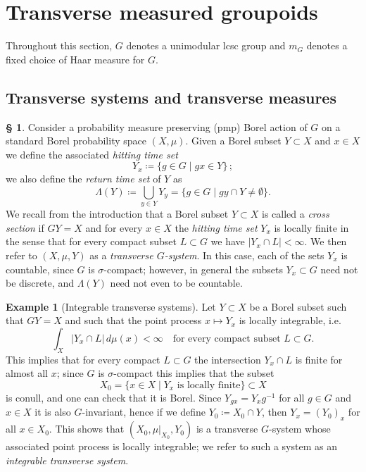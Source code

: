 \documentclass[11pt, oneside]{amsart}
\theoremstyle{definition}
\newtheorem{example}[lemma]{Example}
\newtheorem{no}[lemma]{\S}
\theoremstyle{remark}
\theoremstyle{TheoremNum}
\begin{document}
\section{Transverse measured groupoids}\label{sec:trans:system}
Throughout this section, $G$ denotes a unimodular lcsc group and $m_G$ denotes a fixed choice of Haar measure for $G$.

\subsection{Transverse systems and transverse measures}\label{sec3.1}

\begin{no} Consider a probability measure preserving (pmp) Borel action of $G$ on a standard Borel probability space $(X,\mu)$. Given a Borel subset $Y \subset X$ and $x \in X$ we define the associated \emph{hitting time set} $$Y_x \coloneqq \{g \in G \mid g x \in Y\}\,;$$
   we also define the \emph{return time set} of $Y$ as
\[
\Lambda(Y) \coloneqq \bigcup_{y \in Y} Y_y = \{g \in G \mid g y \cap Y \neq \emptyset\}.
\]
We recall from the introduction that a Borel subset $Y \subset X$ is called a \emph{cross section} if $GY= X$ and for every $x \in X$ the \emph{hitting time set} $Y_x$ is locally finite in the sense that for every compact subset $L \subset G$ we have $|Y_x \cap L| < \infty$. We then refer to $(X, \mu, Y)$ as a \emph{transverse $G$-system}. In this case, each of the sets $Y_x$ is countable, since $G$ is $\sigma$-compact; however, in general the subsets $Y_x \subset G$ need not be discrete, and $\Lambda(Y)$ need not even to be countable.
\end{no}
\begin{example}[Integrable transverse systems] Let $Y \subset X$ be a Borel subset such that $G Y = X$ and such that the point process $x \mapsto Y_x$ is locally integrable, i.e.\
\begin{equation}\label{IntegrabilityDef}
\int_X |Y_x \cap L| \, d \mu(x) < \infty \quad \text{for every compact subset }L \subset G.
\end{equation}
This implies that for every compact $L \subset G$ the intersection $Y_x \cap L$ is finite for almost all $x$; since $G$ is $\sigma$-compact this implies that the subset
\[
X_0 = \{x \in X \mid Y_x \text{ is locally finite}\} \subset X
\]
is conull, and one can check that it is Borel. Since $Y_{gx} = Y_xg^{-1}$ for all $g \in G$ and $x \in X$ it is also $G$-invariant, hence if we define $Y_0 \coloneqq X_0 \cap Y$, then $Y_x = (Y_0)_x$ for all $x \in X_0$. This shows that 
$(X_0, \mu|_{X_0}, Y_0)$ is a transverse $G$-system whose associated point process is locally integrable; we refer to such a system as an \emph{integrable transverse system}.
\end{example}
\end{document}

